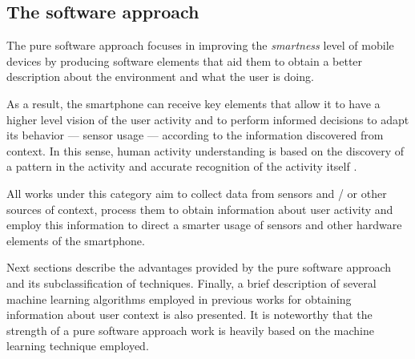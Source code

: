 \subsection{The software approach} 
\label{sub:the_software_approach}

The pure software approach focuses in improving the \emph{smartness} level of mobile devices by producing software elements that aid them to obtain a better description about the environment and what the user is doing.

As a result, the smartphone can receive key elements that allow it to have a higher level vision of the user activity and to perform informed decisions to adapt its behavior --- sensor usage --- according to the information discovered from context.
In this sense, human activity understanding is based on the discovery of a pattern in the activity and accurate recognition of the activity itself \cite{Yurur2014a}.

All works under this category aim to collect data from sensors and / or other sources of context, process them to obtain information about user activity and employ this information to direct a smarter usage of sensors and other hardware elements of the smartphone.

Next sections describe the advantages provided by the pure software approach and its subclassification of techniques.
Finally, a brief description of several machine learning algorithms employed in previous works for obtaining information about user context is also presented. It is noteworthy that the strength of a pure software approach work is heavily based on the machine learning technique employed.


